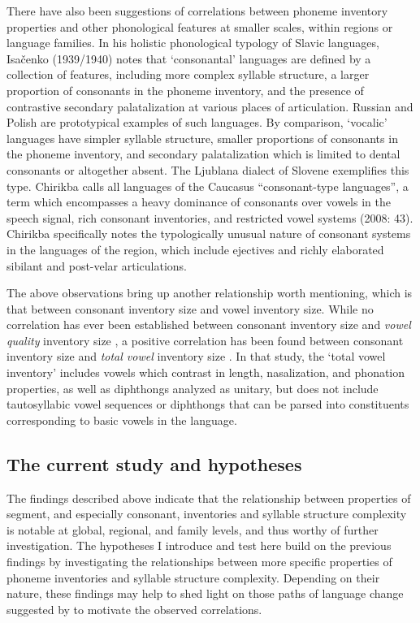   There have also been suggestions of correlations between phoneme inventory properties and other phonological features at smaller scales, within regions or language families. In his holistic phonological typology of Slavic languages, Isačenko (1939/1940) notes that ‘consonantal’ languages are defined by a collection of features, including more complex syllable structure, a larger proportion of consonants in the phoneme inventory, and the presence of contrastive secondary palatalization at various places of articulation. Russian and Polish are prototypical examples of such languages. By comparison, ‘vocalic’ languages have simpler syllable structure, smaller proportions of consonants in the phoneme inventory, and secondary palatalization which is limited to dental consonants or altogether absent. The Ljublana dialect of Slovene exemplifies this type. Chirikba calls all languages of the Caucasus “consonant-type languages”, a term which encompasses a heavy dominance of consonants over vowels in the speech signal, rich consonant inventories, and restricted vowel systems (2008: 43). Chirikba specifically notes the typologically unusual nature of consonant systems in the languages of the region, which include ejectives and richly elaborated sibilant and post-velar articulations.

  The above observations bring up another relationship worth mentioning, which is that between consonant inventory size and vowel inventory size. While no correlation has ever been established between consonant inventory size and \textit{vowel quality} inventory size \citep{Maddieson2013c}, a positive correlation has been found between consonant inventory size and \textit{total vowel} inventory size \citep{Maddieson2011}. In that study, the ‘total vowel inventory’ includes vowels which contrast in length, nasalization, and phonation properties, as well as diphthongs analyzed as unitary, but does not include tautosyllabic vowel sequences or diphthongs that can be parsed into constituents corresponding to basic vowels in the language.

\subsection{The current study and hypotheses}\label{sec:4.1.4}

  The findings described above indicate that the relationship between properties of segment, and especially consonant, inventories and syllable structure complexity is notable at global, regional, and family levels, and thus worthy of further investigation. The hypotheses I introduce and test here build on the previous findings by investigating the relationships between more specific properties of phoneme inventories and syllable structure complexity. Depending on their nature, these findings may help to shed light on those paths of language change suggested by \citet{Maddieson2006} to motivate the observed correlations.

